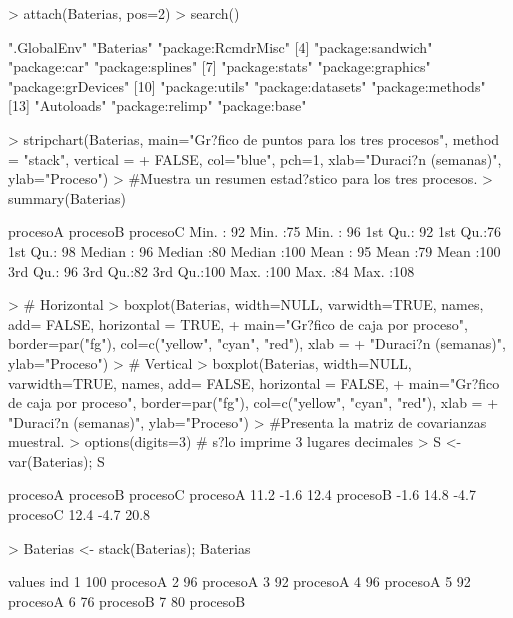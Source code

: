 \documentclass{article}
\begin{document}
\begin{Schunk}
\begin{Sinput}
> attach(Baterias, pos=2)
> search()
\end{Sinput}
\begin{Soutput}
 [1] ".GlobalEnv"        "Baterias"          "package:RcmdrMisc"
 [4] "package:sandwich"  "package:car"       "package:splines"  
 [7] "package:stats"     "package:graphics"  "package:grDevices"
[10] "package:utils"     "package:datasets"  "package:methods"  
[13] "Autoloads"         "package:relimp"    "package:base"     
\end{Soutput}
\begin{Sinput}
> stripchart(Baterias, main="Gr?fico de puntos para los tres procesos", method = "stack", vertical =
+ FALSE, col="blue", pch=1, xlab="Duraci?n (semanas)", ylab="Proceso")
> #Muestra un resumen estad?stico para los tres procesos.
> summary(Baterias)
\end{Sinput}
\begin{Soutput}
    procesoA      procesoB     procesoC  
 Min.   : 92   Min.   :75   Min.   : 96  
 1st Qu.: 92   1st Qu.:76   1st Qu.: 98  
 Median : 96   Median :80   Median :100  
 Mean   : 95   Mean   :79   Mean   :100  
 3rd Qu.: 96   3rd Qu.:82   3rd Qu.:100  
 Max.   :100   Max.   :84   Max.   :108  
\end{Soutput}
\begin{Sinput}
> # Horizontal
> boxplot(Baterias, width=NULL, varwidth=TRUE, names, add= FALSE, horizontal = TRUE,
+ main="Gr?fico de caja por proceso", border=par("fg"), col=c("yellow", "cyan", "red"), xlab =
+ "Duraci?n (semanas)", ylab="Proceso")
> # Vertical
> boxplot(Baterias, width=NULL, varwidth=TRUE, names, add= FALSE, horizontal = FALSE,
+ main="Gr?fico de caja por proceso", border=par("fg"), col=c("yellow", "cyan", "red"), xlab =
+ "Duraci?n (semanas)", ylab="Proceso")
> #Presenta la matriz de covarianzas muestral.
> options(digits=3) # s?lo imprime 3 lugares decimales
> S <- var(Baterias); S
\end{Sinput}
\begin{Soutput}
         procesoA procesoB procesoC
procesoA     11.2     -1.6     12.4
procesoB     -1.6     14.8     -4.7
procesoC     12.4     -4.7     20.8
\end{Soutput}
\begin{Sinput}
> Baterias <- stack(Baterias); Baterias
\end{Sinput}
\begin{Soutput}
   values      ind
1     100 procesoA
2      96 procesoA
3      92 procesoA
4      96 procesoA
5      92 procesoA
6      76 procesoB
7      80 procesoB

\end{Soutput}
\end{Schunk}
\end{document}

